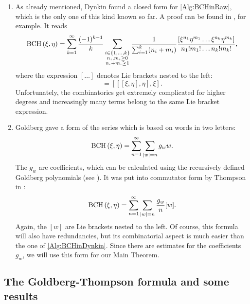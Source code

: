 \begin{enumerate}
	\item
	As already mentioned, Dynkin found a closed form for \eqref{Alg:BCHinRaw},
	which is the only one of this kind known so far. A proof can be found in 
	\cite{jacobson:1979a}, for example. It reads
	\begin{equation}
		\label{Alg:BCHinDynkin}
		\mathrm{BCH}\left(\xi, \eta\right)
		=
		\sum\limits_{k = 1}^{\infty} 
		\frac{ (-1)^{k - 1} }{k}
		\sum\limits_{\substack{
			i \in \{1, \ldots, k\} \\
			n_i, m_i \geq 0 \\ 
			n_i + m_i \geq 1
		}}
		\frac{1}{ \sum_{i = 1}^k(n_i + m_i) }
		\frac{ \left[
			\xi^{n_1} \eta^{m_1} \ldots \xi^{n_k} \eta^{m_k}
		\right]}
		{ n_1! m_1! \ldots n_k! m_k! },
	\end{equation}
	where the expression $[ \ldots ]$ denotes Lie brackets nested to the left:
	\begin{equation*}
		[\xi \eta \eta \xi]
		=
		[[[\xi, \eta], \eta], \xi].
	\end{equation*}
	Unfortunately, the combinatorics get extremely complicated for higher 
	degrees and increasingly many terms belong to the same Lie bracket 
	expression.
	
	\item
	Goldberg gave a form of the series which is based on words in two letters:
	\begin{equation}
		\mathrm{BCH}\left(\xi, \eta\right)
		=
		\sum\limits_{n = 1}^{\infty}
		\sum\limits_{|w| = n}
		g_w w.
	\end{equation}
	The $g_w$ are coefficients, which can be calculated using the recursively
	defined Goldberg polynomials (see \cite{goldberg:1956a}). It was put into 
	commutator form by Thompson in \cite{thompson:1982a}:
	\begin{equation}
		\label{Alg:BCHinGoldbergThompson}
		\mathrm{BCH}\left(\xi, \eta\right)
		=
		\sum\limits_{n = 1}^{\infty}
		\sum\limits_{|w| = n}
		\frac{g_w}{n} [w].
	\end{equation}
	Again, the $[w]$ are Lie brackets nested to the left. Of course, this 
	formula will also have redundancies, but its combinatorial aspect is much 
	easier than the one of \eqref{Alg:BCHinDynkin}. Since there are estimates 
	for the coefficients $g_w$, we will use this form for our Main Theorem.
\end{enumerate}


\subsection{The Goldberg-Thompson formula and some results}

